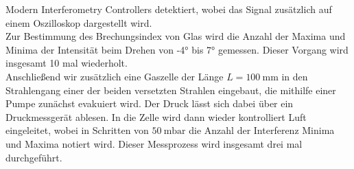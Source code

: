 Modern Interferometry Controllers detektiert, wobei das Signal zusätzlich auf einem
Oszilloskop dargestellt wird. \\
Zur Bestimmung des Brechungsindex von Glas wird die Anzahl der Maxima und Minima
der Intensität beim Drehen von -4° bis 7° gemessen. Dieser Vorgang wird insgesamt 10 mal wiederholt.
\\
Anschließend wir zusätzlich eine Gaszelle der Länge $L=\SI{100}{\milli\metre}$
in den Strahlengang einer der beiden versetzten Strahlen
eingebaut, die mithilfe einer Pumpe zunächst evakuiert wird. Der Druck lässt sich dabei
über ein Druckmessgerät ablesen.
In die Zelle wird dann wieder kontrolliert Luft eingeleitet, wobei in Schritten
von $\SI{50}{\milli\bar}$ die Anzahl der Interferenz Minima und Maxima notiert wird. Dieser
Messprozess wird insgesamt drei mal durchgeführt.

